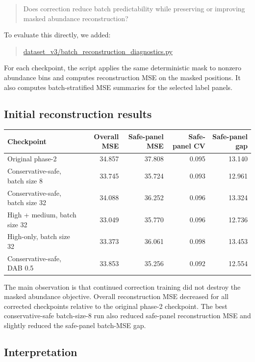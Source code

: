\documentclass[11pt]{article}
\newcommand{\filepath}[1]{\begingroup\urlstyle{tt}\small\url{#1}\endgroup}
\begin{document}
\begin{quote}
Does correction reduce batch predictability while preserving or improving masked
abundance reconstruction?
\end{quote}

To evaluate this directly, we added:

\begin{quote}
\filepath{dataset_v3/batch_reconstruction_diagnostics.py}
\end{quote}

For each checkpoint, the script applies the same deterministic mask to nonzero abundance
bins and computes reconstruction MSE on the masked positions. It also computes
batch-stratified MSE summaries for the selected label panels.

\subsection{Initial reconstruction results}

\begin{center}
\small
\begin{tabular}{p{}rrrr}
\toprule
Checkpoint & Overall MSE & Safe-panel MSE & Safe-panel CV & Safe-panel gap \\
\midrule
Original phase-2 & 34.857 & 37.808 & 0.095 & 13.140 \\
Conservative-safe, batch size 8 & 33.745 & 35.724 & 0.093 & 12.961 \\
Conservative-safe, batch size 32 & 34.088 & 36.252 & 0.096 & 13.324 \\
High + medium, batch size 32 & 33.049 & 35.770 & 0.096 & 12.736 \\
High-only, batch size 32 & 33.373 & 36.061 & 0.098 & 13.453 \\
Conservative-safe, DAB 0.5 & 33.853 & 35.256 & 0.092 & 12.554 \\
\bottomrule
\end{tabular}
\end{center}

The main observation is that continued correction training did not destroy the masked
abundance objective. Overall reconstruction MSE decreased for all corrected checkpoints
relative to the original phase-2 checkpoint. The best conservative-safe batch-size-8 run
also reduced safe-panel reconstruction MSE and slightly reduced the safe-panel
batch-MSE gap.

\subsection{Interpretation}
\end{document}
